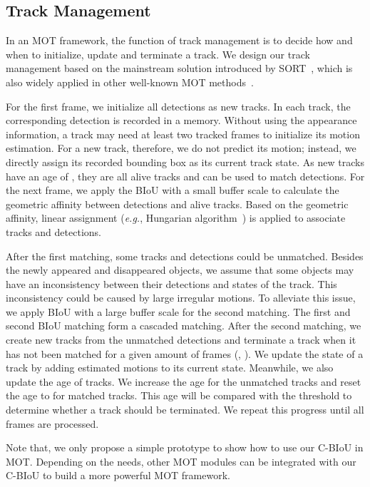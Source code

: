 \documentclass[journal]{IEEEtran}
\newcommand{\eg}{{\it e.g.}}
\begin{document}
\subsection{Track Management}
In an MOT framework, the function of track management is to decide how and when to initialize, update and terminate a track. We design our track management based on the mainstream solution introduced by SORT~\cite{SORT}, which is also widely applied in other well-known MOT methods~\cite{DeepSORT, FairMOT, JDE, bytetrack, cao2022observation}. 

For the first frame, we initialize all detections as new tracks. In each track, the corresponding detection is recorded in a memory. Without using the appearance information, a track may need at least two tracked frames to initialize its motion estimation. For a new track, therefore, we do not predict its motion; instead, we directly assign its recorded bounding box as its current track state. As new tracks have an age of , they are all alive tracks and can be used to match detections. For the next frame, we apply the BIoU with a small buffer scale  to calculate the geometric affinity between detections and alive tracks. Based on the geometric affinity, linear assignment (\eg, Hungarian algorithm~\cite{kuhn1955hungarian}) is applied to associate tracks and detections. 

After the first matching, some tracks and detections could be unmatched.
Besides the newly appeared and disappeared objects, we assume that some objects may have an inconsistency between their detections and states of the track. This inconsistency could be caused by large irregular motions. To alleviate this issue, we apply BIoU with a large buffer scale  for the second matching. The first and second BIoU matching form a cascaded matching. After the second matching, we create new tracks from the unmatched detections and terminate a track when it has not been matched for a given amount of frames (\ie, ). We update the state of a track by adding estimated motions to its current state.  Meanwhile, we also update the age of tracks. We increase the age for the unmatched tracks and reset the age to  for matched tracks. This age will be compared with the threshold  to determine whether a track should be terminated. We repeat this progress until all frames are processed.


Note that, we only propose a simple prototype to show how to use our C-BIoU in MOT. Depending on the needs, other MOT modules can be integrated with our C-BIoU to build a more powerful MOT framework.
\end{document}
